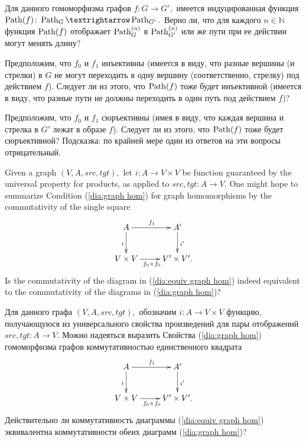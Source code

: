 \documentclass[../main/CT4S-EN-RU]{subfiles}
\begin{document}
\begin{exerciseRUS}
Для данного гомоморфизма графов $f\colon G{→} G',$ имеется индуцированная функция $\Path(f)\colon\Path_{G}{→}\Path_{G'}.$ 
\sexc Верно ли, что для каждого $n\in{ℕ}$ функция $\operatorname{Path}(f)$ отображает $\operatorname{Path}^{(n)}_{G}$ в $\operatorname{Path}^{(n)}_{G'}$ или же пути при ее действии могут менять длину?
\item Предположим, что $f_0$ и $f_1$ инъективны (имеется в виду, что разные вершины (и стрелки) в $G$ не могут переходить в одну вершину (соответственно, стрелку) под действием $f$). Следует ли из этого, что $\operatorname{Path}(f)$ тоже будет инъективной (имеется в виду, что разные пути не должны переходить в один путь под действием $f$)?
\item Предположим, что $f_0$ и $f_1$ сюръективны (имея в виду, что каждая вершина и стрелка в $G'$ лежат в образе $f$). Следует ли из этого, что $\operatorname{Path}(f)$ тоже будет сюръективной? Подсказка: по крайней мере один из ответов на эти вопросы отрицательный.
\endsexc
\end{exerciseRUS}

\begin{exerciseENG}\label{exc:single condition for graph hom}
Given a graph $(V,A,src,tgt),$ let $i\colon A{→} V\times V$ be function guaranteed by the universal property for products, as applied to $src,tgt\colon A{→} V.$ One might hope to summarize Condition (\ref{dia:graph hom}) for graph homomorphisms by the commutativity of the single square 
\begin{align}\label{dia:equiv graph hom}
\xymatrix{A\ar[r]^{f_1}\ar[d]_{i}&A'\ar[d]^{i'}\\V\times V\ar[r]_{f_0\times f_0}&V'\times V'.}
\end{align}
Is the commutativity of the diagram in (\ref{dia:equiv graph hom}) indeed equivalent to the commutativity of the diagrams in (\ref{dia:graph hom})?
\end{exerciseENG}

\begin{exerciseRUS}\label{exc:single condition for graph hom}
Для данного графа $(V,A,src,tgt),$ обозначим $i\colon A{→} V\times V$ функцию, получающуюся из универсального свойства произведений для пары отображений $src,tgt\colon A{→} V.$ Можно надеяться выразить Свойства (\ref{dia:graph hom}) гомоморфизма графов коммутативностью единственного квадрата 
\begin{align}\label{dia:equiv graph hom}
\xymatrix{
    A \ar[r]^{f_1} \ar[d]_{i}  &  A' \ar[d]^{i'}  \\
    V \times V \ar[r]_{f_0 \times f_0}  &  V' \times V'.
}
\end{align}
Действительно ли коммутативность диаграммы (\ref{dia:equiv graph hom}) эквивалентна коммутативности обеих диаграмм (\ref{dia:graph hom})?
\end{exerciseRUS}
\end{document}
